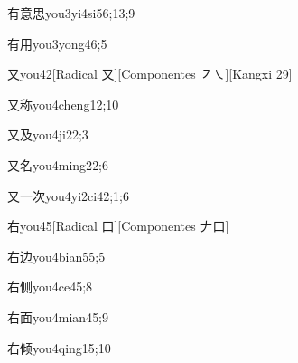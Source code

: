 \begin{verbete}{有意思}{you3yi4si5}{6;13;9}
\end{verbete}

\begin{verbete}{有用}{you3yong4}{6;5}
\end{verbete}

\begin{verbete}{又}{you4}{2}[Radical 又][Componentes ㇇㇏][Kangxi 29]
\end{verbete}

\begin{verbete}{又称}{you4cheng1}{2;10}
\end{verbete}

\begin{verbete}{又及}{you4ji2}{2;3}
\end{verbete}

\begin{verbete}{又名}{you4ming2}{2;6}
\end{verbete}

\begin{verbete}{又一次}{you4yi2ci4}{2;1;6}
\end{verbete}

\begin{verbete}{右}{you4}{5}[Radical 口][Componentes 𠂇口]
\end{verbete}

\begin{verbete}{右边}{you4bian5}{5;5}
\end{verbete}

\begin{verbete}{右侧}{you4ce4}{5;8}
\end{verbete}

\begin{verbete}{右面}{you4mian4}{5;9}
\end{verbete}

\begin{verbete}{右倾}{you4qing1}{5;10}
\end{verbete}


